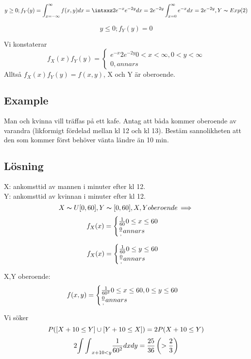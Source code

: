 \documentclass{article}
\begin{document}
\newcommand{\intzxf}{\int^{\infty}_{x=-\infty}}
\newcommand{\intxxf}{\int^{\infty}_{x=0}}
$$
y\ge 0; f_Y(y)=\intzxf f(x,y) dx = \intxxz 2e^{-x}e^{-2y} dx = 2e^{-2y} \intxxf e^{-x} dx = 2e^{-2y} , Y\thicksim Exp(2)
$$

$$
y\leq 0; f_Y(y)=0
$$

Vi konstaterar
$$
f_X(x)f_Y(y)=
\begin{cases}
  e^{-x}2e^{-2y}  0<x<\infty, 0<y<\infty\\
  0, annars
\end{cases}
$$
Alltså $f_X(x)f_Y(y) = f(x,y)$, X och Y är oberoende.

\subsection{Example}
Man och kvinna vill träffas på ett kafe. Antag att båda kommer oberoende av varandra (likformigt fördelad mellan kl 12 och kl 13).
Bestäm sannolikheten att den som kommer först behöver vänta ländre än 10 min.

\subsection{Lösning}
X: ankomsttid av mannen i minuter efter kl 12.\\
Y: ankomsttid av kvinnan i minuter efter kl 12.\\
$$ X\thicksim U[0,60], Y\thicksim [0,60], X, Y oberoende \im $$
$$ f_X(x) = 

\begin{cases}
  \f 1{60} 0\leq x \leq 60\\
  \f 0, annars
\end{cases}$$

$$ f_X(x) = 

\begin{cases}
  \f 1{60} 0\leq y \leq 60\\
  \f 0, annars
\end{cases}$$

X,Y oberoende:
$$ f(x,y) = 

\begin{cases}
  \f 1{60^2} 0\leq x \leq 60, 0\leq y \leq 60\\
  \f 0, annars
\end{cases}$$

Vi söker
$$ P(\left[X+10\le Y\right] \cup \left[Y+10\le X\right]) = 2P(X+10\le Y) $$
$$ 2{\int\int}_{x+10<y} \frac{1}{60^2}dxdy = \frac{25}{36} \left(>\frac{2}{3}\right) $$
\end{document}
